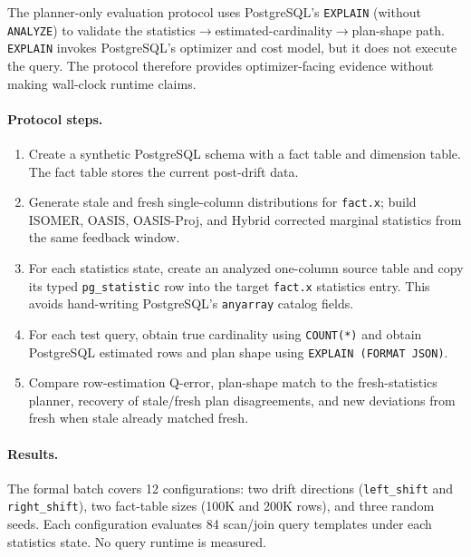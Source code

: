 \documentclass[runningheads]{llncs}
\begin{document}
The planner-only evaluation protocol uses PostgreSQL's \texttt{EXPLAIN}
(without \texttt{ANALYZE}) to validate the
statistics$\rightarrow$estimated-cardinality$\rightarrow$plan-shape path.
\texttt{EXPLAIN} invokes PostgreSQL's optimizer and cost model, but it does not
execute the query. The protocol therefore provides optimizer-facing evidence
without making wall-clock runtime claims.

\paragraph{Protocol steps.}
\begin{enumerate}
  \item Create a synthetic PostgreSQL schema with a fact table and dimension
        table. The fact table stores the current post-drift data.
  \item Generate stale and fresh single-column distributions for
        \texttt{fact.x}; build ISOMER, OASIS, OASIS-Proj, and Hybrid corrected
        marginal statistics from the same feedback window.
  \item For each statistics state, create an analyzed one-column source table
        and copy its typed \texttt{pg\_statistic} row into the target
        \texttt{fact.x} statistics entry. This avoids hand-writing
        PostgreSQL's \texttt{anyarray} catalog fields.
  \item For each test query, obtain true cardinality using \texttt{COUNT(*)}
        and obtain PostgreSQL estimated rows and plan shape using
        \texttt{EXPLAIN (FORMAT JSON)}.
  \item Compare row-estimation Q-error, plan-shape match to the
        fresh-statistics planner, recovery of stale/fresh plan disagreements,
        and new deviations from fresh when stale already matched fresh.
\end{enumerate}

\paragraph{Results.}
The formal batch covers 12 configurations: two drift directions
(\texttt{left\_shift} and \texttt{right\_shift}), two fact-table sizes
(100K and 200K rows), and three random seeds. Each configuration evaluates
84 scan/join query templates under each statistics state. No query runtime is
measured.
\end{document}

